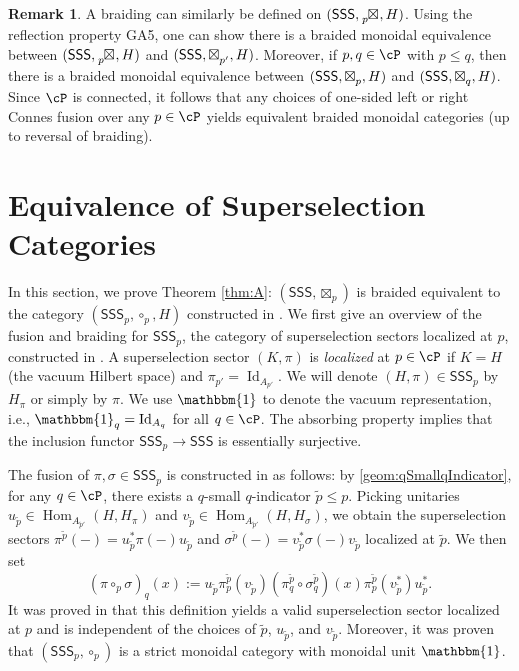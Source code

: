 \documentclass[11pt,reqno]{amsart}
\DeclareMathOperator{\Hom}{Hom}
\DeclareMathOperator{\Id}{Id}
\newcommand{\SSS}{\mathsf{SSS}}
\numberwithin{equation}{section}
\theoremstyle{plain}
\theoremstyle{definition}
\newtheorem{remark}[equation]{Remark}
\begin{document}
\begin{remark}
    A braiding can similarly be defined on $(\SSS,\tensor*[_p]{\boxtimes}{},H)$. Using the reflection property \cite[(GA5)]{MR4927814} GA5, one can show there is a braided monoidal equivalence between $(\SSS,\tensor*[_p]{\boxtimes}{},H)$ and $(\SSS,\tensor*[]{\boxtimes}{_{p'}},H)$. Moreover, if $p,q\in\cP$ with $p\leq q$, then there is a braided monoidal equivalence between $(\SSS,\tensor*[]{\boxtimes}{_p},H)$ and $(\SSS,\tensor*[]{\boxtimes}{_q},H)$. Since $\cP$ is connected, it follows that any choices of one-sided left or right Connes fusion over any $p\in\cP$ yields equivalent braided monoidal categories (up to reversal of braiding). 
\end{remark}

\section{Equivalence of Superselection Categories}\label{sec:equivalencewithendomorphisms}
In this section, we prove Theorem \ref{thm:A}: $(\SSS, \boxtimes_p)$ is braided equivalent to the category $(\SSS_p, \circ_p, H)$ constructed in \cite{MR4927814}. We first give an overview of the fusion and braiding for $\SSS_p$, the category of superselection sectors localized at $p$, constructed in \cite{MR4927814}. A superselection sector $(K, \pi)$ is \textit{localized} at $p \in \cP$ if $K=H$ (the vacuum Hilbert space) and $\pi_{p'}=\Id_{A_{p'}}$. We will denote $(H,\pi)\in\SSS_p$ by $H_\pi$ or simply by $\pi$. We use $\mathbbm{1}$ to denote the vacuum representation, i.e., $\mathbbm{1}_q=\Id_{A_q}$ for all $q\in{\cP}$. The absorbing property implies that the inclusion functor $\SSS_p\to \SSS$ is essentially surjective.
\par The fusion of $\pi,\sigma\in\mathsf{SSS}_p$ is constructed in \cite{MR4927814} as follows:
by \ref{geom:qSmallqIndicator}, for any $q\in\cP$, there exists a $q$-small $q$-indicator $\widetilde{p}\leq p$. Picking unitaries $u_{\widetilde{p}}\in\Hom_{A_{\widetilde{p}'}}(H,H_\pi)$ and $v_{\widetilde{p}}\in\Hom_{A_{\widetilde{p}'}}(H,H_\sigma)$, we obtain the superselection sectors $\pi^{\widetilde{p}}(-)=u_{\widetilde{p}}^*\pi(-)u_{\widetilde{p}}$ and $\sigma^{\widetilde{p}}(-)=v_{\widetilde{p}}^*\sigma(-)v_{\widetilde{p}}$ localized at $\widetilde{p}$. We then set
\[
(\pi\circ_p\sigma)_q(x)
        :=u_{\widetilde{p}}\pi^{\widetilde{p}}_p(v_{\widetilde{p}})(\pi^{\widetilde{p}}_q\circ\sigma^{\widetilde{p}}_q)(x)\pi^{\widetilde{p}}_p(v_{\widetilde{p}}^*)u_{\widetilde{p}}^*.
\]
It was proved in \cite{MR4927814} that this definition yields a valid superselection sector localized at $p$ and is independent of the choices of $\widetilde{p}$, $u_{\widetilde{p}}$, and $v_{\widetilde{p}}$. Moreover, it was proven that $(\SSS_p,\circ_p)$ is a strict monoidal category with monoidal unit $\mathbbm{1}$.
\end{document}
